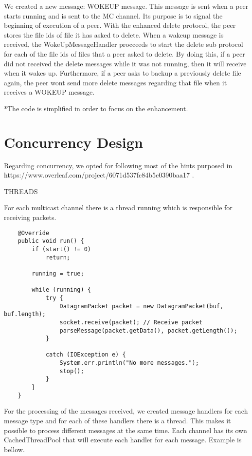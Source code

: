 \documentclass[11pt]{report}
\begin{document}
We created a new message: WOKEUP message. This message is sent when a peer starts running and is sent to the MC channel. Its purpose is to signal the beginning of execution of a peer.
With the enhanced delete protocol, the peer stores the file ids of file it has asked to delete. When a wakeup message is received, the WokeUpMessageHandler procceeds to start the delete sub protocol for each of the file ids of files that a peer asked to delete. By doing this, if a peer did not received the delete messages while it was not running, then it will receive when it wakes up. Furthermore, if a peer asks to backup a previously delete file again, the peer wont send more delete messages regarding that file when it receives a WOKEUP message.

*The code is simplified in order to focus on the enhancement.

\chapter{Concurrency Design}

Regarding concurrency, we opted for following most of the hints purposed in https://www.overleaf.com/project/6071d537fc84b5c0390baa17 .

THREADS

For each multicast channel there is a thread running which is responsible for receiving packets.  

\begin{verbatim}
    @Override
    public void run() {
        if (start() != 0)
            return;

        running = true;

        while (running) {
            try {
                DatagramPacket packet = new DatagramPacket(buf, buf.length);
                socket.receive(packet); // Receive packet
                parseMessage(packet.getData(), packet.getLength());
            }

            catch (IOException e) {
                System.err.println("No more messages.");
                stop();
            }
        }
    }
\end{verbatim}

For the processing of the messages received, we created message handlers for each message type and for each of these handlers there is a thread. This makes it possible to process different messages at the same time. Each channel has its own CachedThreadPool that will execute each handler for each message. Example is bellow.
\end{document}
